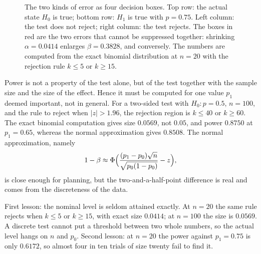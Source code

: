 \begin{figure}[htbp]
\centering
{}
\caption{The two kinds of error as four decision boxes. Top row: the actual
state $H_0$ is true; bottom row: $H_1$ is true with $p=0.75$. Left column: the test
does not reject; right column: the test rejects. The boxes in red are the two errors that
cannot be suppressed together: shrinking $\alpha=0.0414$ enlarges
$\beta=0.3828$, and conversely. The numbers are computed from the exact binomial
distribution at $n=20$ with the rejection rule $k\le5$ or $k\ge15$.}
\label{fig:dua-galat}
\end{figure}

Power is not a property of the test alone, but of the test together with the sample size and
the size of the effect. Hence it must be computed for one value $p_1$ deemed important, not in
general. For a two-sided test with $H_0\colon p=0.5$, $n=100$, and the rule to reject when
$|z|>1.96$, the rejection region is $k\le40$ or $k\ge60$. The exact binomial computation
gives size $0.0569$, not $0.05$, and power $0.8750$ at
$p_1=0.65$, whereas the normal approximation gives $0.8508$. The normal approximation,
namely
\[
1-\beta\approx\Phi\Bigl(\frac{(p_1-p_0)\sqrt n}{\sqrt{p_0(1-p_0)}}-z\Bigr),
\]
is close enough for planning, but the two-and-a-half-point difference is real and comes from
the discreteness of the data.

First lesson: the nominal level is seldom attained exactly. At $n=20$ the same rule rejects
when $k\le5$ or $k\ge15$, with exact size $0.0414$; at $n=100$
the size is $0.0569$. A discrete test cannot put a threshold between two whole
numbers, so the actual level hangs on $n$ and $p_0$. Second lesson: at
$n=20$ the power against $p_1=0.75$ is only $0.6172$, so almost four in ten
trials of size twenty fail to find it.

